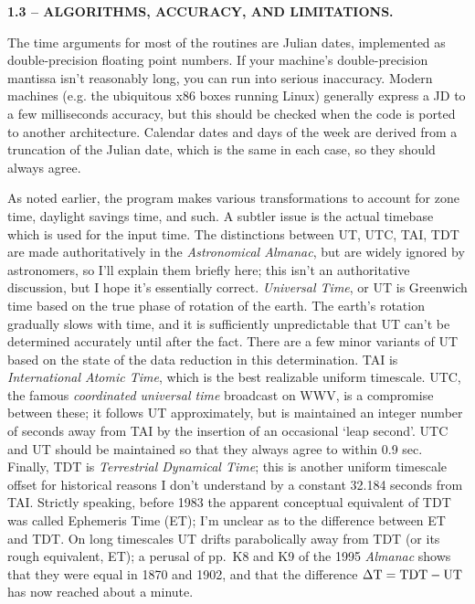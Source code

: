 \par\vfill\eject
\centerline{\bf 1.3 -- ALGORITHMS, ACCURACY, AND LIMITATIONS.}
\medskip
{}
\par
The time arguments for most of the routines are Julian dates, implemented as
double-precision floating point numbers.  If your machine's double-precision 
mantissa isn't reasonably long, you can run into serious inaccuracy.  
Modern machines (e.g. the ubiquitous x86 boxes running Linux) 
generally express a JD to a few milliseconds accuracy, but
this should be checked when the code is ported to another architecture.  
Calendar dates and days of the week are derived from a truncation of the 
Julian date, which is the same in each case, so they should always agree.  
\par
As noted earlier, the program makes various transformations to account
for zone time, daylight savings time, and such.  A subtler issue is the
actual timebase which is used for the input time.  The distinctions
between UT, UTC, TAI, TDT are made authoritatively in the 
{\it Astronomical Almanac}, but are widely ignored by astronomers, so
I'll explain them briefly here; this isn't an authoritative 
discussion, but I hope it's essentially correct.  
{\sl Universal Time}, or UT
is Greenwich time based on the true
phase of rotation of the earth.  The earth's rotation gradually
slows with time, and it is 
sufficiently unpredictable that UT can't be 
determined accurately until after the fact.  There are a few
minor variants of UT based on the state of the data reduction in this
determination.
TAI is {\sl International Atomic Time}, which
is the best realizable uniform timescale.  UTC, the famous {\sl coordinated
universal time} broadcast on WWV, is a compromise between these;
it follows UT approximately, but is maintained an 
integer number of seconds away from TAI by the insertion of an
occasional `leap second'.  UTC and UT should be maintained so that
they always agree to within 0.9 sec.  Finally, TDT is {\sl Terrestrial
Dynamical Time}; this is another uniform timescale offset for historical
reasons I don't understand by a constant 32.184 seconds from TAI.  
Strictly speaking, before 1983
the apparent conceptual equivalent of TDT was called Ephemeris Time (ET); I'm
unclear as to the difference between ET and TDT.  On long timescales
UT drifts parabolically away from TDT (or its rough equivalent, ET); 
a perusal of 
pp.~K8 and K9 of the 1995 {\it Almanac} shows that they were equal in 1870
and 1902, and that the difference $\rm \Delta T = TDT - UT$ has now 
reached about a minute.

